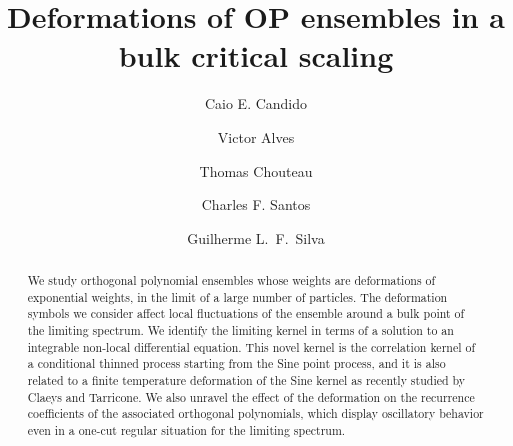 \documentclass[reqno,a4paper,11pt]{amsart}
\theoremstyle{definition}
\theoremstyle{remark}
\numberwithin{equation}{section}
\begin{document}
\title{Deformations of OP ensembles in a bulk critical scaling}

\author[C.~Candido]{Caio E. Candido}
\address[CC]{Instituto de Ciências Matemáticas e de Computação (ICMC), Universidade de S\~ao Paulo (USP), Brazil.}

\author[V.~Alves]{Victor Alves}
\address[VA]{Instituto de Ciências Matemáticas e de Computação (ICMC), Universidade de S\~ao Paulo (USP), Brazil.}

\author[T.~Chouteau]{Thomas Chouteau}
\address[TC]{Instituto de Ciências Matemáticas e de Computação (ICMC), Universidade de S\~ao Paulo (USP), Brazil.}

\author[C.~Santos]{Charles F. Santos}
\address[CS]{Instituto de Ciências Matemáticas e de Computação (ICMC), Universidade de S\~ao Paulo (USP), Brazil.}

\author[G.~Silva]{Guilherme L.~F.~Silva}
\address[GS]{Instituto de Ciências Matemáticas e de Computação (ICMC), Universidade de S\~ao Paulo (USP), Brazil.}


\date{}




\begin{abstract}
    We study orthogonal polynomial ensembles whose weights are deformations of exponential weights, in the limit of a large number of particles. The deformation symbols we consider affect local fluctuations of the ensemble around a bulk point of the limiting spectrum. We identify the limiting kernel in terms of a solution to an integrable non-local differential equation. This novel kernel is the correlation kernel of a conditional thinned process starting from the Sine point process, and it is also related to a finite temperature deformation of the Sine kernel as recently studied by Claeys and Tarricone. We also unravel the effect of the deformation on the recurrence coefficients of the associated orthogonal polynomials, which display oscillatory behavior even in a one-cut regular situation for the limiting spectrum.
\end{abstract}
\end{document}

